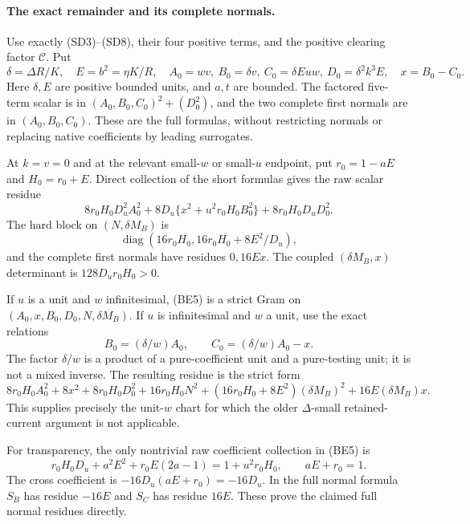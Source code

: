 \paragraph{The exact remainder and its complete normals.}
Use exactly (SD3)--(SD8), their four positive terms, and the positive
clearing factor $\mathcal C$. Put
\[
 \delta=\Delta R/K,\quad E=b^2=\eta K/R,\quad
 A_0=wv,\ B_0=\delta v,\ C_0=\delta Euw,
 \ D_0=\delta^2k^3E,\quad x=B_0-C_0.
\]
Here $\delta,E$ are positive bounded units, and $a,t$ are bounded.
The factored five-term scalar is in
$(A_0,B_0,C_0)^2+(D_0^2)$, and the two complete first normals are
in $(A_0,B_0,C_0)$. These are the full formulas, without restricting
normals or replacing native coefficients by leading surrogates.

At $k=v=0$ and at the relevant small-$w$ or small-$u$ endpoint, put
$r_0=1-aE$ and $H_0=r_0+E$. Direct collection of the short formulas
gives the raw scalar residue
\[
 8r_0H_0D_u^2 A_0^2+
 8D_u\{x^2+u^2r_0H_0B_0^2\}+8r_0H_0D_uD_0^2.
 \tag{BE5}
\]
The hard block on $(N,\delta M_B)$ is
\[
 \operatorname{diag}(16r_0H_0,16r_0H_0+8E^2/D_u),
\]
and the complete first normals have residues $0,16Ex$.
The coupled $(\delta M_B,x)$ determinant is
$128D_ur_0H_0>0$.

If $u$ is a unit and $w$ infinitesimal, (BE5) is a strict Gram on
$(A_0,x,B_0,D_0,N,\delta M_B)$. If $u$ is infinitesimal and $w$ a
unit, use the exact relations
\[
 B_0=(\delta/w)A_0,\qquad C_0=(\delta/w)A_0-x.
\]
The factor $\delta/w$ is a product of a pure-coefficient unit and a
pure-testing unit; it is not a mixed inverse. The resulting residue
is the strict form
\[
 8r_0H_0A_0^2+8x^2+8r_0H_0D_0^2
 +16r_0H_0N^2+(16r_0H_0+8E^2)(\delta M_B)^2
 +16E(\delta M_B)x.                                  \tag{BE6}
\]
This supplies precisely the unit-$w$ chart for which the older
$\Delta$-small retained-current argument is not applicable.

For transparency, the only nontrivial raw coefficient collection in
(BE5) is
\[
 r_0H_0D_u+a^2E^2+r_0E(2a-1)=1+u^2r_0H_0,
 \qquad aE+r_0=1.
\]
The cross coefficient is $-16D_u(aE+r_0)=-16D_u$.
In the full normal formula $S_B$ has residue $-16E$ and $S_C$ has
residue $16E$. These prove the claimed full normal residues directly.

